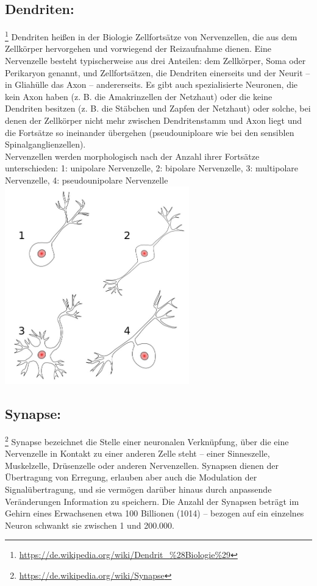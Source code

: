 \subsection{Dendriten:}\footnote{\url{https://de.wikipedia.org/wiki/Dendrit_\%28Biologie\%29}} Dendriten heißen in der Biologie Zellfortsätze von Nervenzellen, die aus dem Zellkörper hervorgehen und vorwiegend der Reizaufnahme dienen. Eine Nervenzelle besteht typischerweise aus drei Anteilen: dem Zellkörper, Soma oder Perikaryon genannt, und Zellfortsätzen, die Dendriten einerseits und der Neurit – in Gliahülle das Axon – andererseits. Es gibt auch spezialisierte Neuronen, die kein Axon haben (z. B. die Amakrinzellen der Netzhaut) oder die keine Dendriten besitzen (z. B. die Stäbchen und Zapfen der Netzhaut) oder solche, bei denen der Zellkörper nicht mehr zwischen Dendritenstamm und Axon liegt und die Fortsätze so ineinander übergehen (pseudouniploare wie bei den sensiblen Spinalganglienzellen).
\\
Nervenzellen werden morphologisch nach der Anzahl ihrer Fortsätze unterschieden:
1: unipolare Nervenzelle, 2: bipolare Nervenzelle, 3: multipolare Nervenzelle, 4: pseudounipolare Nervenzelle\\
\includegraphics[width=0.6\textwidth]{lectures/terms/pix/dendrite.jpg}

\subsection{Synapse:}\footnote{\url{https://de.wikipedia.org/wiki/Synapse}} Synapse bezeichnet die Stelle einer neuronalen Verknüpfung, über die eine Nervenzelle in Kontakt zu einer anderen Zelle steht – einer Sinneszelle, Muskelzelle, Drüsenzelle oder anderen Nervenzellen. Synapsen dienen der Übertragung von Erregung, erlauben aber auch die Modulation der Signalübertragung, und sie vermögen darüber hinaus durch anpassende Veränderungen Information zu speichern. Die Anzahl der Synapsen beträgt im Gehirn eines Erwachsenen etwa 100 Billionen (1014) – bezogen auf ein einzelnes Neuron schwankt sie zwischen 1 und 200.000.

